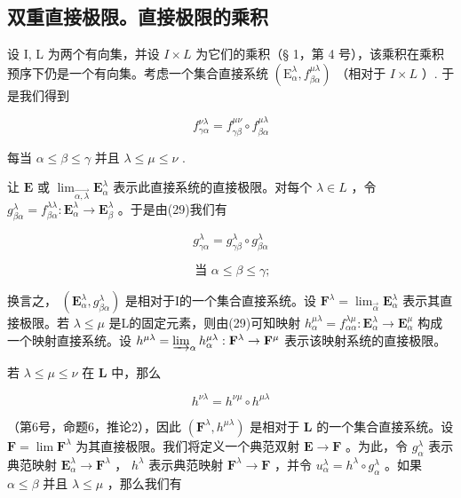 \subsection{双重直接极限。直接极限的乘积}

设 I, L 为两个有向集，并设 \(I \times L\) 为它们的乘积（§ 1，第 4 号），该乘积在乘积预序下仍是一个有向集。考虑一个集合直接系统 \((\mathrm{E}_{\alpha}^{\lambda}, f_{\beta\alpha}^{\mu\lambda})\) （相对于 \(I \times L\) ）. 于是我们得到

\[
f _ {\gamma \alpha} ^ {\nu \lambda} = f _ {\gamma \beta} ^ {\mu \nu} \circ f _ {\beta \alpha} ^ {\mu \lambda}\tag{29}
\]

每当 \(\alpha \leqslant \beta \leqslant \gamma\) 并且 \(\lambda \leqslant \mu \leqslant \nu\) .

让 \(\mathbf{E}\) 或 \(\lim_{\overrightarrow{\alpha, \lambda}} \mathbf{E}_{\alpha}^{\lambda}\) 表示此直接系统的直接极限。对每个 \(\lambda \in L\) ，令 \(g_{\beta \alpha}^{\lambda} = f_{\beta \alpha}^{\lambda \lambda}: \mathbf{E}_{\alpha}^{\lambda} \to \mathbf{E}_{\beta}^{\lambda}\) 。于是由(29)我们有

\[
g _ {\gamma \alpha} ^ {\lambda} = g _ {\gamma \beta} ^ {\lambda} \circ g _ {\beta \alpha} ^ {\lambda}\tag{30}
\]

\[
\text { 当 } \alpha \leqslant \beta \leqslant \gamma ;
\]

换言之， \((\mathbf{E}_{\alpha}^{\lambda}, g_{\beta \alpha}^{\lambda})\) 是相对于I的一个集合直接系统。设 \(\mathbf{F}^{\lambda} = \lim_{\overrightarrow{\alpha}} \mathbf{E}_{\alpha}^{\lambda}\) 表示其直接极限。若 \(\lambda \leqslant \mu\) 是L的固定元素，则由(29)可知映射 \(h_{\alpha}^{\mu \lambda} = f_{\alpha \alpha}^{\lambda \mu}: \mathbf{E}_{\alpha}^{\lambda} \to \mathbf{E}_{\alpha}^{\mu}\) 构成一个映射直接系统。设 \(h^{\mu \lambda} = \varinjlim_{\alpha} h_{\alpha}^{\mu \lambda}: \mathbf{F}^{\lambda} \to \mathbf{F}^{\mu}\) 表示该映射系统的直接极限。

若 \(\lambda \leqslant \mu \leqslant \nu\) 在 \(\mathbf{L}\) 中，那么

\[
h ^ {\nu \lambda} = h ^ {\nu \mu} \circ h ^ {\mu \lambda}\tag{31}
\]

（第6号，命题6，推论2），因此 \((\mathbf{F}^{\lambda}, h^{\mu \lambda})\) 是相对于 \(\mathbf{L}\) 的一个集合直接系统。设 \(\mathbf{F} = \lim \mathbf{F}^{\lambda}\) 为其直接极限。我们将定义一个典范双射 \(\mathbf{E} \to \mathbf{F}\) 。为此，令 \(g_{\alpha}^{\lambda}\) 表示典范映射 \(\mathbf{E}_{\alpha}^{\lambda} \to \mathbf{F}^{\lambda}\) ， \(h^{\lambda}\) 表示典范映射 \(\mathbf{F}^{\lambda} \to \mathbf{F}\) ，并令 \(u_{\alpha}^{\lambda} = h^{\lambda} \circ g_{\alpha}^{\lambda}\) 。如果 \(\alpha \leqslant \beta\) 并且 \(\lambda \leqslant \mu\) ，那么我们有

